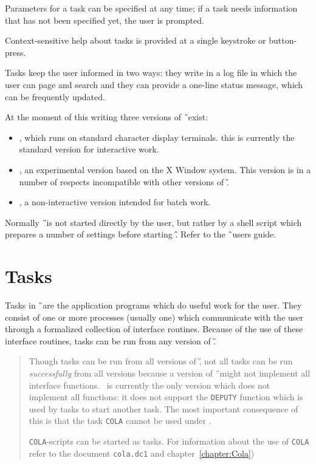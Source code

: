 Parameters for a task can be specified at any time; if a task needs information
that has not been specified yet, the user is prompted.

Context-sensitive help about tasks is provided at a single keystroke or
button-press.

Tasks keep the user informed in two ways: they write in a log file
in which the user can page and search and they can provide a one-line status
message, which can be frequently updated.

At the moment of this writing three versions of \H\ exist:
\begin{itemize}
\item \tH, which runs on standard character display terminals.
this is currently the standard version for interactive work.
\item \xH, an experimental version based on the X Window system.
This version is in a number of respects incompatible with other versions of \H.
\item \nH, a non-interactive version intended for batch work.
\end{itemize}
Normally \H\ is not started directly by the user, but rather by a shell script
which prepares a number of settings before starting \H. Refer to the
\G\ users guide.

\section{Tasks}
Tasks in \G\ are the application programs which do useful work for the user.
They consist of one or more processes (usually one) which communicate with
the user through a formalized collection of interface routines.
Because of the use of these interface routines, tasks can be run from any 
version of \H.

\begin{quote}
\small Though tasks can be run from all versions of \H, not all tasks
can be run {\em successfully} from all versions because a version of \H\ might
not implement all interface functions.
\xH\ is currently the only version which does not implement all
functions: it does not support the {\tt DEPUTY} function which is used by tasks
to start another task. The most important consequence of this is that the task
{\tt COLA} cannot be used under \xH.

{\tt COLA}-scripts can be started as tasks. For information
about the use of {\tt COLA} refer to the document {\tt cola.dc1} and
chapter~\ref{chapter:Cola})
\end{quote}

